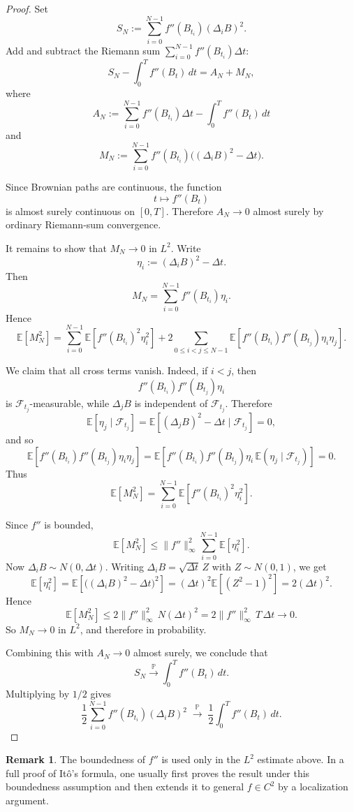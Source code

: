 \documentclass[11pt]{article}
\theoremstyle{definition}
\newtheorem{remark}[theorem]{Remark}
\begin{document}
\begin{proof}
Set
\[
S_N:=\sum_{i=0}^{N-1} f''(B_{t_i})(\Delta_i B)^2.
\]
Add and subtract the Riemann sum \(\sum_{i=0}^{N-1} f''(B_{t_i})\Delta t\):
\[
S_N-\int_0^T f''(B_t)\,dt
=
A_N+M_N,
\]
where
\[
A_N:=\sum_{i=0}^{N-1} f''(B_{t_i})\Delta t-\int_0^T f''(B_t)\,dt
\]
and
\[
M_N:=\sum_{i=0}^{N-1} f''(B_{t_i})\big((\Delta_i B)^2-\Delta t\big).
\]

Since Brownian paths are continuous, the function
\[
t\longmapsto f''(B_t)
\]
is almost surely continuous on \([0,T]\). Therefore \(A_N\to 0\) almost surely by ordinary Riemann-sum convergence.

It remains to show that \(M_N\to 0\) in \(L^2\). Write
\[
\eta_i:=(\Delta_i B)^2-\Delta t.
\]
Then
\[
M_N=\sum_{i=0}^{N-1} f''(B_{t_i})\eta_i.
\]
Hence
\[
\mathbb E[M_N^2]
=
\sum_{i=0}^{N-1}\mathbb E\!\left[f''(B_{t_i})^2\eta_i^2\right]
+
2\sum_{0\le i<j\le N-1}\mathbb E\!\left[f''(B_{t_i})f''(B_{t_j})\eta_i\eta_j\right].
\]

We claim that all cross terms vanish. Indeed, if \(i<j\), then
\[
f''(B_{t_i})f''(B_{t_j})\eta_i
\]
is \(\mathcal F_{t_j}\)-measurable, while \(\Delta_j B\) is independent of \(\mathcal F_{t_j}\). Therefore
\[
\mathbb E[\eta_j\mid \mathcal F_{t_j}]
=
\mathbb E[(\Delta_j B)^2-\Delta t\mid \mathcal F_{t_j}]
=
0,
\]
and so
\[
\mathbb E\!\left[f''(B_{t_i})f''(B_{t_j})\eta_i\eta_j\right]
=
\mathbb E\!\left[
f''(B_{t_i})f''(B_{t_j})\eta_i\,
\mathbb E(\eta_j\mid \mathcal F_{t_j})
\right]
=
0.
\]
Thus
\[
\mathbb E[M_N^2]
=
\sum_{i=0}^{N-1}\mathbb E\!\left[f''(B_{t_i})^2\eta_i^2\right].
\]

Since \(f''\) is bounded,
\[
\mathbb E[M_N^2]
\le
\|f''\|_\infty^2
\sum_{i=0}^{N-1}\mathbb E[\eta_i^2].
\]
Now \(\Delta_i B\sim N(0,\Delta t)\). Writing \(\Delta_i B=\sqrt{\Delta t}\,Z\) with \(Z\sim N(0,1)\), we get
\[
\mathbb E[\eta_i^2]
=
\mathbb E\!\left[\big((\Delta_i B)^2-\Delta t\big)^2\right]
=
(\Delta t)^2\mathbb E[(Z^2-1)^2]
=
2(\Delta t)^2.
\]
Hence
\[
\mathbb E[M_N^2]
\le
2\|f''\|_\infty^2\,N(\Delta t)^2
=
2\|f''\|_\infty^2\,T\,\Delta t
\longrightarrow 0.
\]
So \(M_N\to 0\) in \(L^2\), and therefore in probability.

Combining this with \(A_N\to 0\) almost surely, we conclude that
\[
S_N \xrightarrow{\mathbb P} \int_0^T f''(B_t)\,dt.
\]
Multiplying by \(1/2\) gives
\[
\frac12\sum_{i=0}^{N-1} f''(B_{t_i})(\Delta_i B)^2
\;\xrightarrow{\mathbb P}\;
\frac12\int_0^T f''(B_t)\,dt.
\]
\end{proof}

\begin{remark}
The boundedness of \(f''\) is used only in the \(L^2\) estimate above. In a full proof of It\^o's formula, one usually first proves the result under this boundedness assumption and then extends it to general \(f\in C^2\) by a localization argument.
\end{remark}
\end{document}
